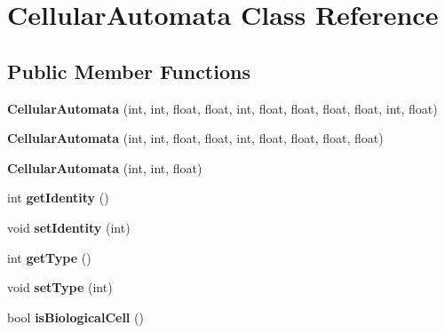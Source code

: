 \hypertarget{class_cellular_automata}{}\section{Cellular\+Automata Class Reference}
\label{class_cellular_automata}
\subsection*{Public Member Functions}
\begin{DoxyCompactItemize}
\item 
\hypertarget{class_cellular_automata_ac817d90643103e2e54fc1b7f1915c59c}{}{\bfseries Cellular\+Automata} (int, int, float, float, int, float, float, float, float, int, float)\label{class_cellular_automata_ac817d90643103e2e54fc1b7f1915c59c}

\item 
\hypertarget{class_cellular_automata_a57081abe784fccb917674c77e5a0a105}{}{\bfseries Cellular\+Automata} (int, int, float, float, int, float, float, float, float)\label{class_cellular_automata_a57081abe784fccb917674c77e5a0a105}

\item 
\hypertarget{class_cellular_automata_a16b26e98aff6267732f16c7f362ec4e2}{}{\bfseries Cellular\+Automata} (int, int, float)\label{class_cellular_automata_a16b26e98aff6267732f16c7f362ec4e2}

\item 
\hypertarget{class_cellular_automata_a63b3da58df830226cde2e6c2cf7eca84}{}int {\bfseries get\+Identity} ()\label{class_cellular_automata_a63b3da58df830226cde2e6c2cf7eca84}

\item 
\hypertarget{class_cellular_automata_acc1049f472e28f0cb190484cd1a8342d}{}void {\bfseries set\+Identity} (int)\label{class_cellular_automata_acc1049f472e28f0cb190484cd1a8342d}

\item 
\hypertarget{class_cellular_automata_abaf6f23fa09b36906f16ebc37ffb43f1}{}int {\bfseries get\+Type} ()\label{class_cellular_automata_abaf6f23fa09b36906f16ebc37ffb43f1}

\item 
\hypertarget{class_cellular_automata_afa16b493b758885c93dbad087b16f082}{}void {\bfseries set\+Type} (int)\label{class_cellular_automata_afa16b493b758885c93dbad087b16f082}

\item 
\hypertarget{class_cellular_automata_aa5d41ee0bebe356557b878b8ea5a2c12}{}bool {\bfseries is\+Biological\+Cell} ()\label{class_cellular_automata_aa5d41ee0bebe356557b878b8ea5a2c12}


\end{DoxyCompactItemize}
